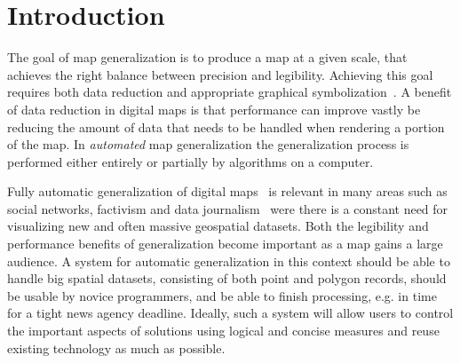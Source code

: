 \section{Introduction}






The goal of map generalization is to produce a map at a given scale, that achieves the right balance between precision and legibility. Achieving this goal requires both data reduction and appropriate graphical symbolization~\cite{brassel1988generalization,gruenreich1985cag}. A benefit of data reduction in digital maps is that performance can improve vastly be reducing the amount of data that needs to be handled when rendering a portion of the map. In \emph{automated} map generalization the generalization process is performed either entirely or partially by algorithms on a computer.

Fully automatic generalization of digital maps~\cite{nutanong2012multiresolution,sarma2012fusiontables} is relevant in many areas such as social networks, factivism and data journalism~\cite{cohen2011journalism,bono,sankaranarayanan2009twitterstand} were there is a constant need for visualizing new and often massive geospatial datasets. Both the legibility and performance benefits of generalization become important as a map gains a large audience. A system for automatic generalization in this context should be able to handle big spatial datasets, consisting of both point and polygon records, should be usable by novice programmers, and be able to finish processing, e.g. in time for a tight news agency deadline. Ideally, such a system will allow users to control the important aspects of solutions using logical and concise measures and reuse existing technology as much as possible.

